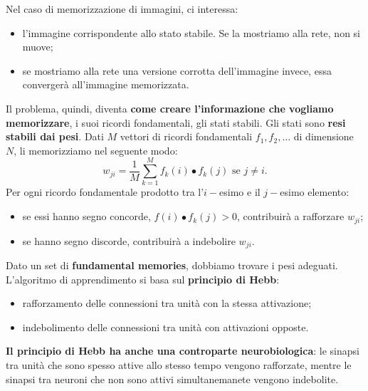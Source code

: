 Nel caso di memorizzazione di immagini, ci interessa:
\begin{itemize}
    \item l'immagine corrispondente allo stato stabile. Se la mostriamo alla rete, non si muove;
    \item se mostriamo alla rete una versione corrotta dell'immagine invece, essa convergerà all'immagine memorizzata.
\end{itemize}
Il problema, quindi, diventa \textbf{come creare l'informazione che vogliamo memorizzare}, i suoi ricordi fondamentali, gli stati stabili. Gli stati sono \textbf{resi stabili dai pesi}.
\newline
\newline
Dati $M$ vettori di ricordi fondamentali $f_1,f_2,\dots$ di dimensione $N$, li memorizziamo nel seguente modo:
\begin{equation}
    w_{ji}=\frac{1}{M}\sum^M_{k=1}f_k(i)\bullet f_k(j) \text{ se } j\neq i.
\end{equation}
Per ogni ricordo fondamentale prodotto tra l'$i-$esimo e il $j-$esimo elemento:
\begin{itemize}
    \item se essi hanno segno concorde, $f(i)\bullet f_k(j)>0$, contribuirà a rafforzare $w_{ji}$;
    \item se hanno segno discorde, contribuirà a indebolire $w_{ji}$.
\end{itemize}
\newpage
Dato un set di \textbf{fundamental memories}, dobbiamo trovare i pesi adeguati. L'algoritmo di apprendimento si basa sul \textbf{principio di Hebb}:
\begin{itemize}
    \item rafforzamento delle connessioni tra unità con la stessa attivazione;
    \item indebolimento delle connessioni tra unità con attivazioni opposte.
\end{itemize}


\textbf{Il principio di Hebb ha anche una controparte neurobiologica}: le sinapsi tra unità che sono spesso attive allo stesso tempo vengono rafforzate, mentre le sinapsi tra neuroni che non sono attivi simultanemanete vengono indebolite.


